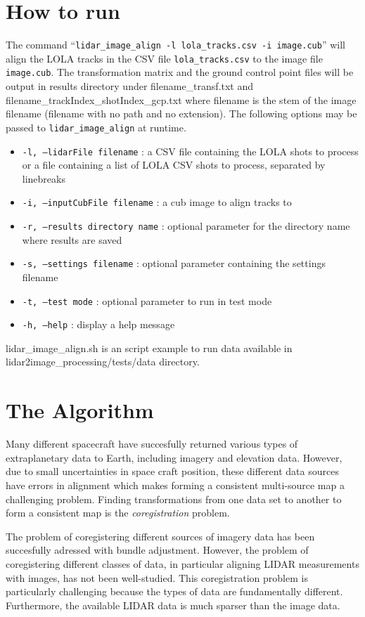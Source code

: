 \documentclass[float=false, crop=false]{standalone}
\begin{document}
\section{How to run}
The command ``\texttt{lidar\_image\_align -l lola\_tracks.csv -i image.cub}'' will        
align the LOLA tracks in the CSV file \texttt{lola\_tracks.csv} to the image file \texttt{image.cub}.
The transformation matrix and the ground control point files will be output in results directory under
filename\_transf.txt and filename\_trackIndex\_shotIndex\_gcp.txt where filename is the stem of the image
filename (filename with no path and no extension). The following options may be passed to
{\texttt{lidar\_image\_align}} at runtime.                   
\begin{itemize}
	\item{\texttt{-l, --lidarFile filename}} : a CSV file containing the LOLA shots to process or a file containing a
        list of LOLA CSV shots to process, separated by linebreaks
	\item{\texttt{-i, --inputCubFile filename}} : a cub image to align tracks to
        \item{\texttt{-r, --results directory name}} : optional parameter for the directory name where results are saved
        \item{\texttt{-s, --settings filename}} : optional parameter containing the settings filename
        \item{\texttt{-t, --test mode}} : optional parameter to run in test mode
	\item{\texttt{-h, --help}} : display a help message
\end{itemize}

lidar\_image\_align.sh is an script example to run data available in lidar2image\_processing/tests/data directory.  
\section{The Algorithm}

Many different spacecraft have succesfully returned various types of extraplanetary data to Earth,
including imagery and elevation data. However, due to small uncertainties in space craft
position, these different data sources have errors in alignment which makes forming a
consistent multi-source map a challenging problem. Finding transformations from one data
set to another to form a consistent map is the {\emph{coregistration}} problem.

The problem of coregistering different sources of imagery data has been succesfully adressed
with bundle adjustment. However, the problem of coregistering different classes
of data, in particular aligning LIDAR measurements with images, has not been well-studied.
This coregistration problem is particularly challenging because the types of data are
fundamentally different. Furthermore, the available LIDAR data is much sparser than
the image data.
\end{document}
